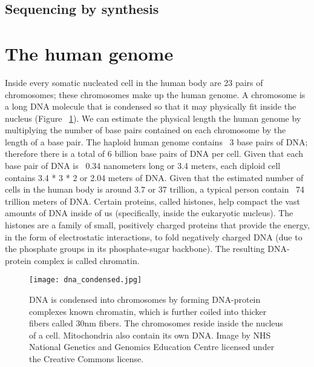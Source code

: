 \subsection{Sequencing by synthesis}


\section{The human genome}

Inside every somatic nucleated cell in the human body are 23 pairs of chromosomes; these chromosomes make up the human genome. A chromosome is a long DNA molecule that is condensed so that it may physically fit inside the nucleus (Figure ~\ref{fig:dna_condensed}). We can estimate the physical length the human genome by multiplying the number of base pairs contained on each chromosome by the length of a base pair. The haploid human genome contains ~3 base pairs of DNA; therefore there is a total of 6 billion base pairs of DNA per cell. Given that each base pair of DNA is ~0.34 nanometers long or 3.4 meters\cite{pmid7354864}, each diploid cell contains 3.4 * 3 * 2 or 2.04 meters of DNA. Given that the estimated number of cells in the human body is around 3.7 or 37 trillion\cite{pmid23829164}, a typical person contain ~74 trillion meters of DNA. Certain proteins, called histones, help compact the vast amounts of DNA inside of us (specifically, inside the eukaryotic nucleus). The histones are a family of small, positively charged proteins that provide the energy, in the form of electrostatic interactions, to fold negatively charged DNA (due to the phosphate groups in its phosphate-sugar backbone). The resulting DNA-protein complex is called chromatin.

\begin{figure}[h]
   \centering
   \texttt{[image: dna\_condensed.jpg]}
   \caption[Condensation of DNA]{DNA is condensed into chromosomes by forming DNA-protein complexes known chromatin, which is further coiled into thicker fibers called 30nm fibers. The chromosomes reside inside the nucleus of a cell. Mitochondria also contain its own DNA. Image by NHS National Genetics and Genomics Education Centre licensed under the Creative Commons license.}
   \label{fig:dna_condensed}
\end{figure}

